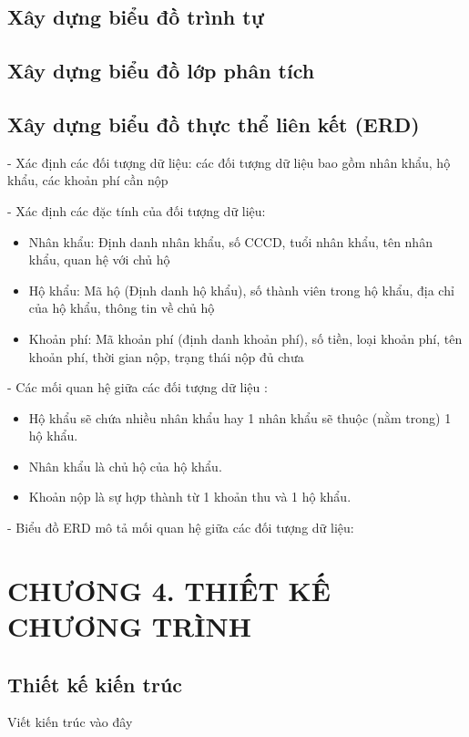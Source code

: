 \documentclass{article}
\begin{document}
\subsection{Xây dựng biểu đồ trình tự}
\subsection{Xây dựng biểu đồ lớp phân tích}
\subsection{Xây dựng biểu đồ thực thể liên kết (ERD)}
- Xác định các đối tượng dữ liệu: các đối tượng dữ liệu bao gồm nhân khẩu, hộ khẩu, các khoản phí cần nộp

- Xác định các đặc tính của đối tượng dữ liệu:
\begin{itemize}[leftmargin = 1.5cm]
    \item Nhân khẩu: Định danh nhân khẩu, số CCCD, tuổi nhân khẩu, tên nhân khẩu, quan hệ với chủ hộ
    \item Hộ khẩu: Mã hộ (Định danh hộ khẩu), số thành viên trong hộ khẩu, địa chỉ của hộ khẩu, thông tin về chủ hộ
    \item Khoản phí: Mã khoản phí (định danh khoản phí), số tiền, loại khoản phí, tên khoản phí, thời gian nộp, trạng thái nộp đủ chưa
\end{itemize}

- Các mối quan hệ giữa các đối tượng dữ liệu : 
\begin{itemize}[leftmargin = 1.5cm]
    \item Hộ khẩu sẽ chứa nhiều nhân khẩu hay 1 nhân khẩu sẽ thuộc (nằm trong) 1 hộ khẩu.
    \item Nhân khẩu là chủ hộ của hộ khẩu.
    \item Khoản nộp là sự hợp thành từ 1 khoản thu và 1 hộ khẩu. 
\end{itemize}

- Biểu đồ ERD mô tả mối quan hệ giữa các đối tượng dữ liệu:
\newpage 

\section*{CHƯƠNG 4. THIẾT KẾ CHƯƠNG TRÌNH}
\setcounter{section}{4}
\setcounter{subsection}{0}

\subsection{Thiết kế kiến trúc}
Viết kiến trúc vào đây
\end{document}
